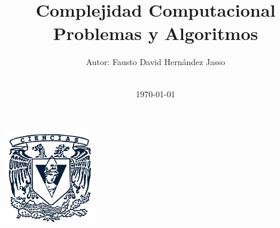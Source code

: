 \title{\Large Complejidad Computacional  \\[0.5cm]
        \bf\Large Problemas y Algoritmos}
\author{\large Autor: Fausto David Hernández Jasso\\ \ \\}
\date{\large \today}

\makeatletter
    \begin{titlepage}
        \begin{center}
	   { \includegraphics[width=4cm]{facultad-de-ciencias.jpg}}
	   {\ \\ \ \\}
        \vbox{}\vspace{5cm}
            {\@title }\\[3cm] 
            {\@author}
            {\@date\\}

        \end{center}
    \end{titlepage}
\makeatother
